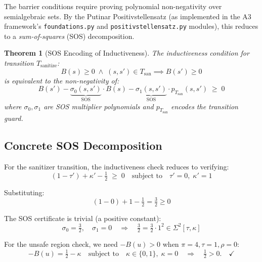 \documentclass[11pt,a4paper]{article}
\theoremstyle{plain}
\newtheorem{theorem}{Theorem}[section]
\theoremstyle{definition}
\theoremstyle{remark}
\begin{document}
The barrier conditions require proving polynomial non-negativity over
semialgebraic sets.  By the Putinar Positivstellensatz
(as implemented in the A3 framework's \texttt{foundations.py} and
\texttt{positivstellensatz.py} modules), this reduces to a
\emph{sum-of-squares} (SOS) decomposition.

\begin{theorem}[SOS Encoding of Inductiveness]
\label{thm:sos}
The inductiveness condition for transition $T_{\text{sanitize}}$:
\[
  B(s) \geq 0 \;\wedge\; (s,s') \in T_{\text{san}}
  \implies B(s') \geq 0
\]
is equivalent to the non-negativity of:
\begin{equation}
  B(s') - \underbrace{\sigma_0(s,s')}_{\text{SOS}} \cdot B(s)
    - \underbrace{\sigma_1(s,s')}_{\text{SOS}} \cdot p_{T_{\text{san}}}(s,s')
    \;\geq\; 0
\end{equation}
where $\sigma_0, \sigma_1$ are SOS multiplier polynomials and
$p_{T_{\text{san}}}$ encodes the transition guard.
\end{theorem}

\subsection{Concrete SOS Decomposition}

For the sanitizer transition, the inductiveness check reduces to
verifying:
\begin{equation}
  (1 - \tau') + \kappa' - \tfrac{1}{2} \;\geq\; 0
  \quad\text{subject to}\quad
  \tau' = 0,\; \kappa' = 1
\end{equation}

Substituting:
\begin{equation}
  (1 - 0) + 1 - \tfrac{1}{2} = \tfrac{3}{2} \geq 0
\end{equation}

The SOS certificate is trivial (a positive constant):
\begin{equation}
  \sigma_0 = \tfrac{3}{2}, \quad \sigma_1 = 0
  \quad\Longrightarrow\quad
  \tfrac{3}{2} = \tfrac{3}{2} \cdot 1^2 \in \Sigma^2[\tau, \kappa]
\end{equation}

For the unsafe region check, we need
$-B(u) > 0$ when $\pi=4, \tau=1, \rho=0$:
\begin{equation}
  -B(u) = \tfrac{1}{2} - \kappa
  \quad\text{subject to}\quad
  \kappa \in \{0,1\},\; \kappa = 0
  \quad\Longrightarrow\quad
  \tfrac{1}{2} > 0. \quad\checkmark
\end{equation}
\end{document}
